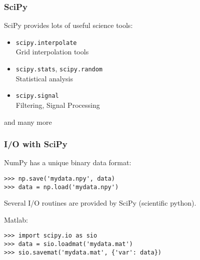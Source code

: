 \begin{frame}[fragile]
    \frametitle{SciPy}

    SciPy provides lots of useful science tools:
    \begin{itemize}
        \item \lstinline|scipy.interpolate|\\
            Grid interpolation tools
        \item \lstinline|scipy.stats|, \lstinline|scipy.random|\\
            Statistical analysis
        \item \lstinline|scipy.signal|\\
            Filtering, Signal Processing
    \end{itemize}
    and many more
\end{frame}

\begin{frame}[fragile]\frametitle{I/O with SciPy}
    
    NumPy has a unique binary data format:
    \begin{lstlisting}
>>> np.save('mydata.npy', data)
>>> data = np.load('mydata.npy')
    \end{lstlisting}

    Several I/O routines are provided by SciPy (scientific python).

    Matlab:
    \begin{lstlisting}
>>> import scipy.io as sio
>>> data = sio.loadmat('mydata.mat')
>>> sio.savemat('mydata.mat', {'var': data})
    \end{lstlisting}
\end{frame}
